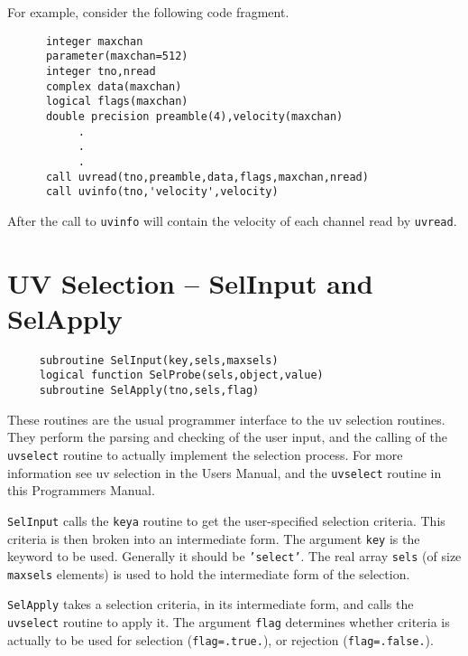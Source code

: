 \documentclass{report}
\begin{document}
For example, consider the following code fragment.
\begin{verbatim}
      integer maxchan
      parameter(maxchan=512)
      integer tno,nread
      complex data(maxchan)
      logical flags(maxchan)
      double precision preamble(4),velocity(maxchan)
           .
           .
           .
      call uvread(tno,preamble,data,flags,maxchan,nread)
      call uvinfo(tno,'velocity',velocity)
\end{verbatim}
After the call to {\tt uvinfo} will contain the velocity of each channel
read by {\tt uvread}.

\section{UV Selection -- SelInput and SelApply}
\label{sect:select}
\begin{verbatim}
     subroutine SelInput(key,sels,maxsels)
     logical function SelProbe(sels,object,value)
     subroutine SelApply(tno,sels,flag)
\end{verbatim}
These routines are the usual programmer interface to the uv selection
routines. They perform the parsing and checking of the user input, and
the calling of the {\tt uvselect} routine to actually implement the
selection process. For
more information see uv selection in the Users Manual, and the {\tt uvselect}
routine in this Programmers Manual.

{\tt SelInput} calls the {\tt keya} routine to get the user-specified
selection criteria. This criteria is then broken into an intermediate form.
The argument {\tt key} is the keyword to be used. Generally it should be
{\tt 'select'}. The real array {\tt sels} (of size {\tt maxsels} elements)
is used to hold the intermediate form of the selection.

{\tt SelApply} takes a selection criteria, in its intermediate form, and
calls the {\tt uvselect} routine to apply it. The argument {\tt flag} determines
whether criteria is actually to be used for selection ({\tt flag=.true.}), or
rejection ({\tt flag=.false.}).
\end{document}
